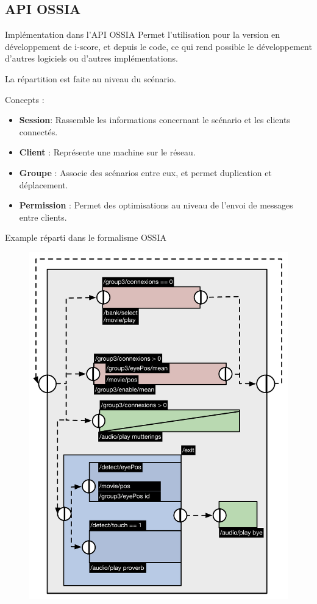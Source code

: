 \subsection{API OSSIA}
\begin{frame}{Implémentation dans l'API OSSIA}
	Permet l'utilisation pour la version en développement de i-score, et depuis le code, ce qui rend possible le développement d'autres logiciels ou d'autres implémentations.
	
	La répartition est faite au niveau du scénario.
	
	Concepts : 
	\begin{itemize}
		\item \textbf{Session}: Rassemble les informations concernant le scénario et les clients connectés. 
		\item \textbf{Client} :  Représente une machine sur le réseau.
		\item \textbf{Groupe} :  Associe des scénarios entre eux, et permet duplication et déplacement.
		\item \textbf{Permission} :  
		Permet des optimisations au niveau de l'envoi de messages entre clients.
	\end{itemize}
\end{frame}

\begin{frame}{Example réparti dans le formalisme OSSIA}
	\begin{figure}
		\centering
		\includegraphics[scale=0.33]{../src/images/ossiaDistri.pdf}
	\end{figure}
\end{frame}

